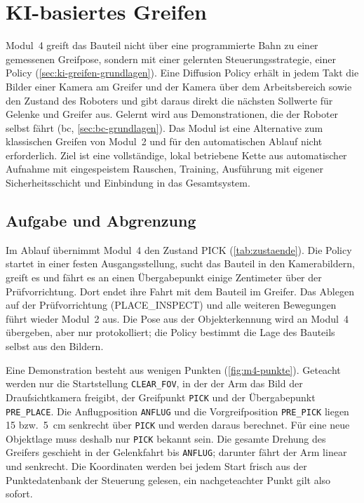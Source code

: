 \chapter{KI-basiertes Greifen}
\label{ch:kigreifen}


Modul~4 greift das Bauteil nicht über eine programmierte Bahn zu einer gemessenen Greifpose,
sondern mit einer gelernten Steuerungsstrategie, einer Policy (\cref{sec:ki-greifen-grundlagen}).
Eine Diffusion Policy erhält in jedem Takt die Bilder einer Kamera am Greifer und der Kamera über
dem Arbeitsbereich sowie den Zustand des Roboters und gibt daraus direkt die nächsten Sollwerte
für Gelenke und Greifer aus. Gelernt wird aus Demonstrationen, die der Roboter selbst fährt
(\ac{bc}, \cref{sec:bc-grundlagen}). Das Modul ist eine Alternative zum klassischen Greifen von
Modul~2 und für den automatischen Ablauf nicht erforderlich. Ziel ist eine vollständige, lokal
betriebene Kette aus automatischer Aufnahme mit eingespeistem Rauschen, Training, Ausführung mit
eigener Sicherheitsschicht und Einbindung in das Gesamtsystem.

\section{Aufgabe und Abgrenzung}
\label{sec:m4-aufgabe}

Im Ablauf übernimmt Modul~4 den Zustand PICK (\cref{tab:zustaende}). Die Policy startet in einer
festen Ausgangsstellung, sucht das Bauteil in den Kamerabildern, greift es und fährt es an einen
Übergabepunkt einige Zentimeter über der Prüfvorrichtung. Dort endet ihre Fahrt mit dem Bauteil
im Greifer. Das Ablegen auf der Prüfvorrichtung (PLACE\_INSPECT) und alle weiteren Bewegungen
führt wieder Modul~2 aus. Die Pose aus der Objekterkennung wird an Modul~4 übergeben, aber nur
protokolliert; die Policy bestimmt die Lage des Bauteils selbst aus den Bildern.

Eine Demonstration besteht aus wenigen Punkten (\cref{fig:m4-punkte}). Geteacht werden nur die
Startstellung \texttt{CLEAR\_FOV}, in der der Arm das Bild der Draufsichtkamera freigibt, der
Greifpunkt \texttt{PICK} und der Übergabepunkt \texttt{PRE\_PLACE}. Die Anflugposition
\texttt{ANFLUG} und die Vorgreifposition \texttt{PRE\_PICK} liegen \SI{15}{} bzw.\
\SI{5}{\centi\metre} senkrecht über \texttt{PICK} und werden daraus berechnet. Für eine neue
Objektlage muss deshalb nur \texttt{PICK} bekannt sein. Die gesamte Drehung des Greifers geschieht
in der Gelenkfahrt bis \texttt{ANFLUG}; darunter fährt der Arm linear und senkrecht. Die
Koordinaten werden bei jedem Start frisch aus der Punktedatenbank der Steuerung gelesen, ein
nachgeteachter Punkt gilt also sofort.

